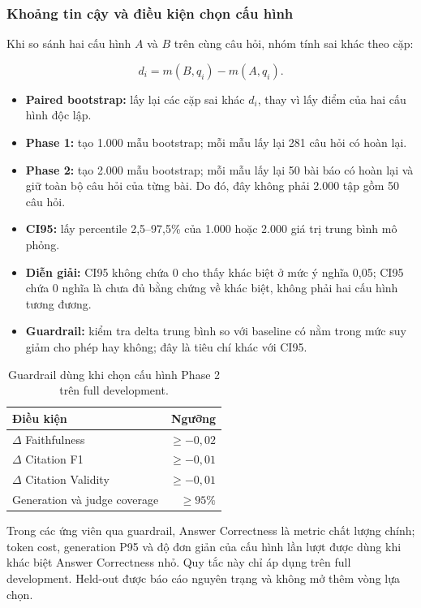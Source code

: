 \subsubsection{Khoảng tin cậy và điều kiện chọn cấu hình}

Khi so sánh hai cấu hình $A$ và $B$ trên cùng câu hỏi, nhóm tính sai khác theo
cặp:

\begin{equation}
  d_i = m(B,q_i)-m(A,q_i).
\end{equation}

\begin{itemize}
  \item \textbf{Paired bootstrap:} lấy lại các cặp sai khác $d_i$, thay vì lấy
  điểm của hai cấu hình độc lập.
  \item \textbf{Phase 1:} tạo 1.000 mẫu bootstrap; mỗi mẫu lấy lại 281 câu hỏi
  có hoàn lại.
  \item \textbf{Phase 2:} tạo 2.000 mẫu bootstrap; mỗi mẫu lấy lại 50 bài báo
  có hoàn lại và giữ toàn bộ câu hỏi của từng bài. Do đó, đây không phải 2.000
  tập gồm 50 câu hỏi.
  \item \textbf{CI95:} lấy percentile 2,5--97,5\% của 1.000 hoặc 2.000 giá trị
  trung bình mô phỏng.
  \item \textbf{Diễn giải:} CI95 không chứa 0 cho thấy khác biệt ở mức ý nghĩa
  0,05; CI95 chứa 0 nghĩa là chưa đủ bằng chứng về khác biệt, không phải hai cấu
  hình tương đương.
  \item \textbf{Guardrail:} kiểm tra delta trung bình so với baseline có nằm
  trong mức suy giảm cho phép hay không; đây là tiêu chí khác với CI95.
\end{itemize}

\begin{table}[htbp]
  \centering
  \caption{Guardrail dùng khi chọn cấu hình Phase 2 trên full development.}
  \label{tab:phase2-guardrails}
  \begin{tabular}{@{}lr@{}}
    \toprule
    \textbf{Điều kiện} & \textbf{Ngưỡng} \\
    \midrule
    $\Delta$ Faithfulness & $\geq -0{,}02$ \\
    $\Delta$ Citation F1 & $\geq -0{,}01$ \\
    $\Delta$ Citation Validity & $\geq -0{,}01$ \\
    Generation và judge coverage & $\geq 95\%$ \\
    \bottomrule
  \end{tabular}
\end{table}

Trong các ứng viên qua guardrail, Answer Correctness là metric chất lượng chính;
token cost, generation P95 và độ đơn giản của cấu hình lần lượt được dùng khi
khác biệt Answer Correctness nhỏ. Quy tắc này chỉ áp dụng trên full development.
Held-out được báo cáo nguyên trạng và không mở thêm vòng lựa chọn.
